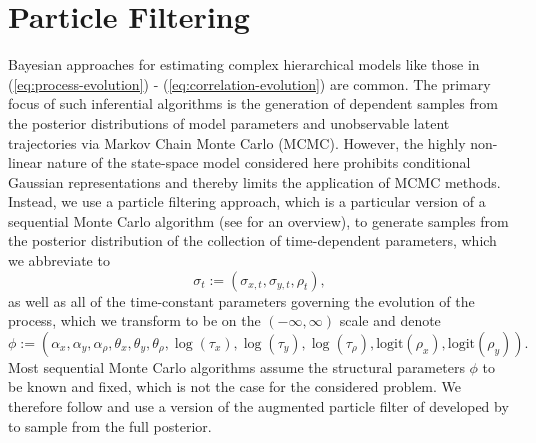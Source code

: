 \documentclass[10pt]{article}
\begin{document}
\section{Particle Filtering}
Bayesian approaches for estimating complex hierarchical models like
those in (\ref{eq:process-evolution}) -
(\ref{eq:correlation-evolution}) are common. The primary focus of such
inferential algorithms is the generation of dependent samples from the
posterior distributions of model parameters and unobservable latent
trajectories via Markov Chain Monte Carlo (MCMC). However, the highly
non-linear nature of the state-space model considered here prohibits
conditional Gaussian representations and thereby limits the
application of MCMC methods. Instead, we use a particle filtering
approach, which is a particular version of a sequential Monte Carlo
algorithm (see \cite{doucet2001sequential} for an overview), to
generate samples from the posterior distribution of the collection of
time-dependent parameters, which we abbreviate to
\[
  \sigma_t := (\sigma_{x,t}, \sigma_{y,t}, \rho_t),
\]
as well as all of the time-constant parameters governing the evolution
of the process, which we transform to be on the $(-\infty, \infty)$
scale and denote
\[
  \phi := (\alpha_x, \alpha_y, \alpha_\rho, \theta_x, \theta_y,
  \theta_\rho, \log(\tau_x), \log(\tau_y), \log(\tau_\rho),
  \mbox{logit}(\rho_x), \mbox{logit}(\rho_y)).
\]
Most sequential Monte Carlo algorithms assume the structural
parameters $\phi$ to be known and fixed, which is not the case for the
considered problem. We therefore follow \cite{rodriguez2012} and use a
version of the augmented particle filter of \cite{pitt1999filtering}
developed by \cite{liu2001combined} to sample from the full
posterior.
\end{document}
